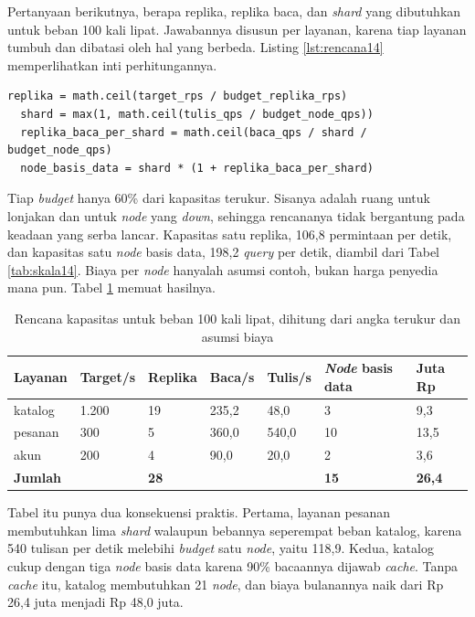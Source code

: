 Pertanyaan berikutnya, berapa replika, replika baca, dan \textit{shard} yang
dibutuhkan untuk beban 100 kali lipat. Jawabannya disusun per layanan, karena
tiap layanan tumbuh dan dibatasi oleh hal yang berbeda. Listing
\ref{lst:rencana14} memperlihatkan inti perhitungannya.

\begin{lstlisting}[style=PythonStyle, caption={Replika, \textit{shard}, dan replika baca dari angka terukur, tersedia di \berkas{sources/chapter14/rencana-kapasitas.py}}, label={lst:rencana14}]
  replika = math.ceil(target_rps / budget_replika_rps)
  shard = max(1, math.ceil(tulis_qps / budget_node_qps))
  replika_baca_per_shard = math.ceil(baca_qps / shard / budget_node_qps)
  node_basis_data = shard * (1 + replika_baca_per_shard)
\end{lstlisting}

Tiap \textit{budget} hanya 60\% dari kapasitas terukur. Sisanya adalah ruang
untuk lonjakan dan untuk \textit{node} yang \textit{down}, sehingga rencananya tidak bergantung
pada keadaan yang serba lancar. Kapasitas satu replika, 106,8 permintaan per
detik, dan kapasitas satu \textit{node} basis data, 198,2 \textit{query} per detik,
diambil dari Tabel \ref{tab:skala14}. Biaya per \textit{node} hanyalah asumsi contoh,
bukan harga penyedia mana pun. Tabel \ref{tab:rencana14} memuat hasilnya.

\begin{table}[!htb]
  \centering
  \caption{Rencana kapasitas untuk beban 100 kali lipat, dihitung dari angka
           terukur dan asumsi biaya}
  \label{tab:rencana14}
  \begin{tabularx}{\textwidth}{Xllllll}
    \hline
    \textbf{Layanan} & \textbf{Target/s} & \textbf{Replika} & \textbf{Baca/s} & \textbf{Tulis/s} & \textbf{\textit{Node} basis data} & \textbf{Juta Rp} \\
    \hline
    katalog & 1.200 & 19 & 235,2 & 48,0 & 3 & 9,3 \\
    \hline
    pesanan & 300 & 5 & 360,0 & 540,0 & 10 & 13,5 \\
    \hline
    akun & 200 & 4 & 90,0 & 20,0 & 2 & 3,6 \\
    \hline
    \textbf{Jumlah} & & \textbf{28} & & & \textbf{15} & \textbf{26,4} \\
    \hline
  \end{tabularx}
\end{table}

Tabel itu punya dua konsekuensi praktis. Pertama, layanan pesanan membutuhkan
lima \textit{shard} walaupun bebannya seperempat beban katalog, karena 540
tulisan per detik melebihi \textit{budget} satu \textit{node}, yaitu 118,9. Kedua,
katalog cukup dengan tiga \textit{node} basis data karena 90\% bacaannya dijawab
\textit{cache}. Tanpa \textit{cache} itu, katalog membutuhkan 21 \textit{node}, dan
biaya bulanannya naik dari Rp 26,4 juta menjadi Rp 48,0 juta.

